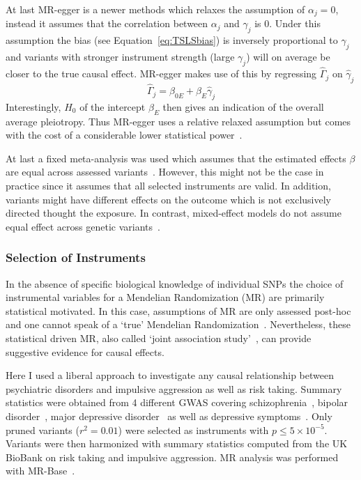 At last MR-egger is a newer methods which relaxes the assumption of $\alpha_j=0$, instead it assumes that the correlation between $\alpha_j$ and $\gamma_j$ is $0$.
Under this assumption the bias (see Equation~\ref{eq:TSLSbias}) is inversely proportional to $\gamma_j$ and variants with stronger instrument strength (large $\gamma_j$) will on average be closer to the true causal effect.
MR-egger makes use of this by regressing $\hat{\Gamma}_j$ on $\hat{\gamma}_j$
\begin{equation}\label{eq:egger}
  \hat{\Gamma}_j = \beta_{0E} + \beta_{E} \hat{\gamma}_j
\end{equation}
Interestingly, $H_0$ of the intercept $\beta_E$ then gives an indication of the overall average pleiotropy.
Thus MR-egger uses a relative relaxed assumption but comes with the cost of a considerable lower statistical power~\cite{Bowden2015}.

At last a fixed meta-analysis was used which assumes that the estimated effects $\beta$ are equal across assessed variants~\cite{Burgess2015b}.
However, this might not be the case in practice since it assumes that all selected instruments are valid.
In addition, variants might have different effects on the outcome which is not exclusively directed thought the exposure. 
In contrast, mixed-effect models do not assume equal effect across genetic variants~\cite{Burgess2015b}.

\subsubsection{Selection of Instruments}
\label{ssub:Selection_of_Intstuments}

In the absence of specific biological knowledge of individual SNPs the choice of instrumental variables for a Mendelian Randomization (MR) are primarily statistical motivated.
In this case, assumptions of MR are only assessed post-hoc and one cannot speak of a `true' Mendelian Randomization~\cite{Burgess2016a}.
Nevertheless, these statistical driven MR, also called `joint association study'~\cite{Burgess2016a}, can provide suggestive evidence for causal effects.

Here I used a liberal approach to investigate any causal relationship between psychiatric disorders and impulsive aggression as well as risk taking.
Summary statistics were obtained from 4 different GWAS covering schizophrenia~\cite{Ripke2014}, bipolar disorder~\cite{PsychiatricGWASConsortiumBipolarDisorderWorkingGroup2011}, major depressive disorder~\cite{MajorDepressiveDisorderWorkingGroupofthePsychiatricGWASConsortium2013} as well as depressive symptoms~\cite{Okbay2016}.
Only pruned variants ($r^2=0.01$) were selected as instruments with $p\leq 5\times 10^{-5}$.
Variants were then harmonized with summary statistics computed from the UK BioBank on risk taking and impulsive aggression. 
MR analysis was performed with MR-Base~\cite{Hemani2016}.

